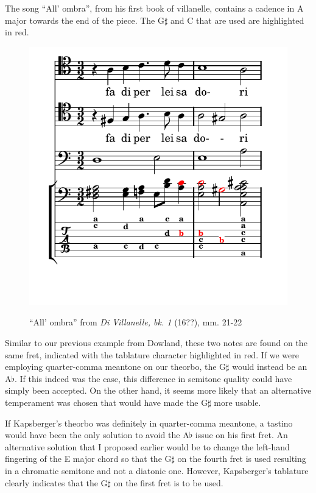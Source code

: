 The song ``All' ombra'', from his first book of villanelle, contains a cadence in A major
towards the end of the piece.  The G$\sharp$ and C that are used are highlighted in red.
\begin{figure}[h]
\centering
\includegraphics{examples/kaps_ombria.pdf}
\label{kaps-ombria}
\caption{``All' ombra'' from \textit{Di Villanelle, bk. 1} (16??), mm. 21-22 }
\end{figure}
Similar to our previous example from Dowland, these two notes are found on the
same fret, indicated with the tablature character  highlighted in red.
If we were employing quarter-comma meantone on our theorbo, the G$\sharp$ would
instead be an A$\flat$. If this indeed was the case, this difference in semitone
quality could have simply been accepted.  On the other hand, it seems more
likely that an alternative temperament was chosen that would have made the
G$\sharp$ more usable.

If Kapsberger's theorbo was definitely in quarter-comma meantone, a tastino would have
been the only solution to avoid the A$\flat$ issue on his first fret.  An alternative
solution that I proposed earlier would be to change the left-hand fingering of the E
major chord so that the G$\sharp$ on the fourth fret is used resulting in a chromatic
semitone and not a diatonic one.  However, Kapsberger's tablature clearly indicates
that the G$\sharp$ on the first fret is to be used.

